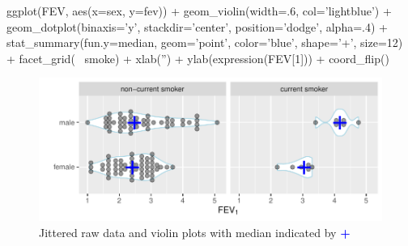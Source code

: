 \begin{Schunk}
\begin{Sinput}
ggplot(FEV, aes(x=sex, y=fev)) +
  geom_violin(width=.6, col='lightblue') +
  geom_dotplot(binaxis='y', stackdir='center', position='dodge', alpha=.4) +
  stat_summary(fun.y=median, geom='point', color='blue', shape='+', size=12) +
  facet_grid(~ smoke) +
  xlab('') + ylab(expression(FEV[1])) + coord_flip()
\end{Sinput}
\begin{figure}[htbp]

\centerline{\includegraphics[width=\maxwidth]{descript-vplot-1} }

\caption[Jittered raw data and violin plots with median indicated by \textbf{\textcolor{blue}{+}}]{Jittered raw data and violin plots with median indicated by \textbf{\textcolor{blue}{+}}}\label{fig:descript-vplot}
\end{figure}
\end{Schunk}

  

